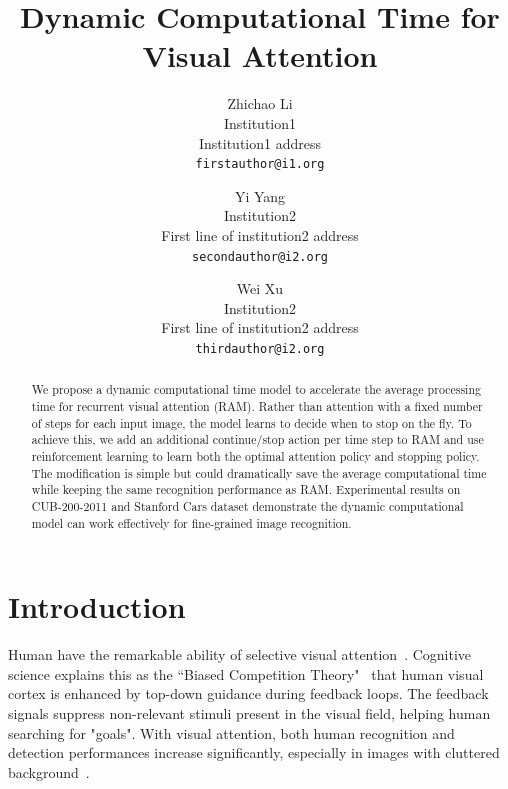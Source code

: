 \documentclass[10pt,twocolumn,letterpaper]{article}
\begin{document}
\title{Dynamic Computational Time for Visual Attention}

\author{Zhichao Li\\
Institution1\\
Institution1 address\\
{\tt\small firstauthor@i1.org}
\and
Yi Yang\\
Institution2\\
First line of institution2 address\\
{\tt\small secondauthor@i2.org}
\and
Wei Xu\\
Institution2\\
First line of institution2 address\\
{\tt\small thirdauthor@i2.org}
}

\maketitle


\begin{abstract}
We propose a dynamic computational time model to accelerate the average processing time for recurrent visual attention (RAM).
Rather than attention with a fixed number of steps for each input image, the model learns to decide when to stop on the fly.
To achieve this, we add an additional continue/stop action per time step to RAM and use reinforcement learning to learn both the optimal attention policy and stopping policy.
The modification is simple but could dramatically save the average computational time while keeping the same recognition performance as RAM.
Experimental results on CUB-200-2011 and Stanford Cars dataset demonstrate the dynamic computational model can work effectively for fine-grained image recognition.
\end{abstract}

\section{Introduction}


Human have the remarkable ability of selective visual attention~\cite{hayhoe2005eye, desimone1995neural}.
Cognitive science explains this as the ``Biased Competition Theory"~\cite{beck2009top, desimone1998visual} that human visual cortex is enhanced by top-down guidance during feedback loops.
The feedback signals suppress non-relevant stimuli present in the visual field, helping human searching for "goals".
With visual attention, both human recognition and detection performances increase significantly, especially in images with cluttered background~\cite{cichy2014resolving}.
\end{document}
